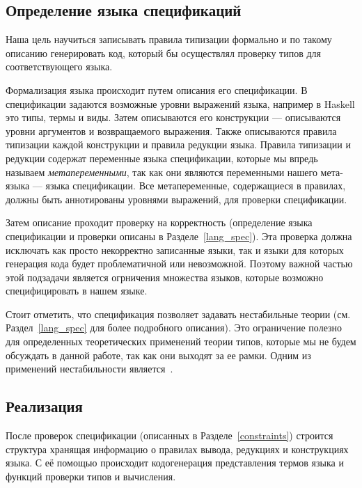 \subsection*{Определение языка спецификаций}

Наша цель научиться записывать правила типизации формально и по такому описанию генерировать код, который бы осуществлял проверку типов для соответствующего языка.

Формализация языка происходит путем описания его спецификации. В спецификации задаются возможные уровни выражений языка, например в Haskell это типы, термы и виды. Затем описываются его конструкции --- описываются уровни аргументов и возвращаемого выражения. Также описываются правила типизации каждой конструкции и правила редукции языка. Правила типизации и редукции содержат переменные языка спецификации, которые мы впредь называем \textit{метапеременными}, так как они являются переменными нашего мета-языка --- языка спецификации. Все метапеременные, содержащиеся в правилах, должны быть аннотированы уровнями выражений, для проверки спецификации.

Затем описание проходит проверку на корректность (определение языка спецификации и проверки описаны в Разделе~\ref{lang_spec}). Эта проверка должна исключать как просто некорректно записанные языки, так и языки для которых генерация кода будет проблематичной или невозможной. Поэтому важной частью этой подзадачи является огрничения множества языков, которые возможно специфицировать в нашем языке.

Стоит отметить, что спецификация позволяет задавать нестабильные теории (см. Раздел~\ref{lang_spec} для более подробного описания). Это ограничение полезно для определенных теоретических применений теории типов, которые мы не будем обсуждать в данной работе, так как они выходят за ее рамки. Одним из применений нестабильности является~\cite{ncat:inf}.


\subsection*{Реализация}

После проверок спецификации (описанных в Разделе~\ref{constraints}) строится структура хранящая информацию о правилах вывода, редукциях и конструкциях языка. С её помощью происходит кодогенерация представления термов языка и функций проверки типов и вычисления.

